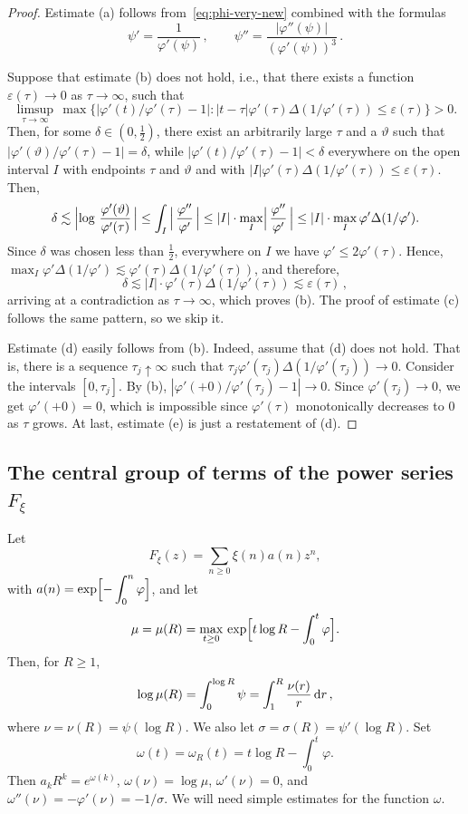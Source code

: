 \documentclass[11pt]{amsart}
\numberwithin{equation}{section}
\def\ep{{\varepsilon}}
\begin{document}
\begin{proof}
Estimate (a) follows from~\eqref{eq:phi-very-new} combined with the formulas
\[
\psi' = \frac1{\varphi'(\psi)}\,,
\qquad \psi''=\frac{|\varphi''(\psi)|}{(\varphi'(\psi))^3}\,.
\]

Suppose that estimate (b) does not hold, i.e., that there exists a function $\ep(\tau)\to 0$
as $\tau\to\infty$, such that
\[
\limsup_{\tau\to\infty}\, \max\{|\varphi'(t)/\varphi'(\tau)-1|\colon |t-\tau|\varphi'(\tau)\Delta(1/\varphi'(\tau)) \le \ep(\tau) \} > 0.
\]
Then, for some $\delta\in (0, \tfrac12)$, there exist an arbitrarily large $\tau$ and a
$\vartheta$ such that $|\varphi' (\vartheta)/\varphi'(\tau)-1|=\delta$, while
$|\varphi' (t)/\varphi'(\tau)-1|<\delta$ everywhere on the open interval $I$ with endpoints $\tau$ and $\vartheta$ and with $ |I|\varphi'(\tau)\Delta(1/\varphi'(\tau)) \le \ep(\tau) $.
Then,
\[
\delta \lesssim \Bigl| \log\,\frac{\varphi'(\vartheta)}{\varphi'(\tau)}\, \Bigr|
\le \int_I\, \Bigl|\, \frac{\varphi''}{\varphi'}\, \Bigr| \le |I|\cdot \max_I \Bigl|\, \frac{\varphi''}{\varphi'}\, \Bigr| \le |I|\cdot \max_I \varphi' \Delta(1/\varphi').
\]
Since $\delta$ was chosen less than $\tfrac12$,
everywhere on $I$ we have $ \varphi' \le 2\varphi'(\tau) $. Hence,
$ \max_I \varphi' \Delta(1/\varphi') \lesssim \varphi'(\tau) \Delta(1/\varphi'(\tau)) $, and therefore,
\[
\delta \lesssim |I| \cdot \varphi'(\tau) \Delta(1/\varphi'(\tau)) \lesssim \ep(\tau)\,,
\]
arriving at a contradiction as $\tau\to\infty$, which proves (b).
The proof of estimate (c) follows the same pattern, so we skip it.

Estimate (d) easily follows from (b). Indeed, assume that (d) does not hold.
That is, there is a sequence $\tau_j\uparrow\infty$ such that
$\tau_j \varphi'(\tau_j)\Delta(1/\varphi'(\tau_j))\to 0$. Consider the intervals
$[0, \tau_j]$. By (b), $|\varphi'(+0)/\varphi'(\tau_j)-1|\to 0$. Since $\varphi'(\tau_j)\to 0$,
we get $\varphi'(+0) = 0$, which is impossible since $\varphi'(\tau)$ monotonically decreases to $0$
as $\tau$ grows. At last, estimate (e) is just a restatement of (d).
\end{proof}

\subsection{The central group of terms of the power series $F_\xi$}\label{subsec:Laplace}

Let
\[
F_\xi (z) = \sum_{n\ge 0} \xi (n) a(n) z^n,
\]
with
$a(n) = \displaystyle \exp\Bigl[ - \int_0^n \varphi \Bigr]$, and let
\[
\mu = \mu (R) = \max_{t\ge 0}\, \exp \Bigl[ t\log R - \int_0^t \varphi \Bigr].
\]
Then, for $R\ge 1$,
\[
\log \mu (R) = \int_0^{\log R} \psi = \int_1^R \frac{\nu (r)}{r}\, {\rm d}r\,,
\]
where $\nu = \nu (R) = \psi (\log R)$.
We also let $\sigma = \sigma (R) = \psi'(\log R)$. 
Set
\[
\omega (t) = \omega_R (t) = t\log R - \int_0^t \varphi.
\]
Then $a_k R^k = e^{\omega (k)}$, $\omega (\nu) = \log \mu$,
$\omega'(\nu)=0$, and $\omega''(\nu) = - \varphi'(\nu) = - 1/\sigma$.
We will need simple estimates for the function $\omega$.
\end{document}
